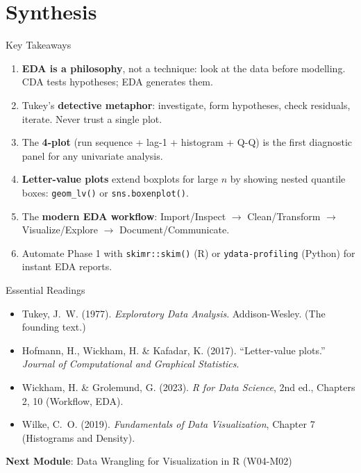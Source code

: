\documentclass[10pt]{beamer}
\begin{document}
\section{Synthesis}

\begin{frame}{Key Takeaways}
  \begin{enumerate}
    \item \textbf{EDA is a philosophy}, not a technique: look at the data
          before modelling. CDA tests hypotheses; EDA generates them.
    \item Tukey's \textbf{detective metaphor}: investigate, form hypotheses,
          check residuals, iterate. Never trust a single plot.
    \item The \textbf{4-plot} (run sequence + lag-1 + histogram + Q-Q) is
          the first diagnostic panel for any univariate analysis.
    \item \textbf{Letter-value plots} extend boxplots for large $n$ by
          showing nested quantile boxes: \texttt{geom\_lv()} or
          \texttt{sns.boxenplot()}.
    \item The \textbf{modern EDA workflow}: Import/Inspect $\rightarrow$
          Clean/Transform $\rightarrow$ Visualize/Explore $\rightarrow$
          Document/Communicate.
    \item Automate Phase 1 with \texttt{skimr::skim()} (R) or
          \texttt{ydata-profiling} (Python) for instant EDA reports.
  \end{enumerate}
\end{frame}

\begin{frame}{Essential Readings}
  \begin{itemize}
    \item Tukey, J.~W. (1977). \emph{Exploratory Data Analysis}.
          Addison-Wesley. (The founding text.)
    \item Hofmann, H., Wickham, H. \& Kafadar, K. (2017). ``Letter-value
          plots.'' \emph{Journal of Computational and Graphical Statistics}.
    \item Wickham, H. \& Grolemund, G. (2023). \emph{R for Data Science},
          2nd ed., Chapters 2, 10 (Workflow, EDA).
    \item Wilke, C.~O. (2019). \emph{Fundamentals of Data Visualization},
          Chapter 7 (Histograms and Density).
  \end{itemize}
  \vspace{6pt}
  \textbf{Next Module}: Data Wrangling for Visualization in R (W04-M02)
\end{frame}
\end{document}
